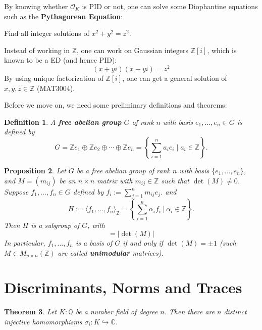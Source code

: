 \documentclass[11pt]{book}
\newtheorem{theorem}{Theorem}[section]
\newtheorem{definition}[theorem]{Definition}
\newtheorem{proposition}[theorem]{Proposition}
\begin{document}
By knowing whether $\mathcal{O}_K$ is PID or not, one can solve some Diophantine equations such as the {\bf Pythagorean Equation}: 
\begin{center}
Find all integer solutions of $x^2 + y^2 = z^2$.     
\end{center}
Instead of working in $\mathbb{Z}$, one can work on Gaussian integers $\mathbb{Z}[i]$, which is known to be a ED (and hence PID):
    \begin{equation*}
         (x + yi)(x - yi) = z^2
    \end{equation*}
By using unique factorization of $\mathbb{Z}[i]$, one can get a general solution of $x,y,z \in \mathbb{Z}$ (MAT3004). 

\medskip
Before we move on, we need some preliminary definitions and theorems:
\begin{definition}
A {\bf free abelian group} $G$ of rank $n$ with basis $e_1, \dots, e_n \in G$ is defined by
\begin{equation*}
    G = \mathbb{Z}e_1 \oplus \mathbb{Z}e_2 \oplus \cdots \oplus \mathbb{Z}e_n = \left\{ \sum_{i=1}^n a_i e_i \mid a_i \in \mathbb{Z} \right\}.
\end{equation*}
\end{definition}

\begin{proposition} \label{prop-indexfree}
Let $G$ be a free abelian group of rank $n$ with basis $\{e_1, \ldots, e_n\}$, and $M = (m_{ij})$ be an $n \times n$ matrix with $m_{ij} \in \mathbb{Z}$ such that $\det(M) \neq 0$.
Suppose $f_1, \dots, f_n \in G$ defined by $f_i := \sum_{j=1}^n m_{ij} e_j$.
and 
$$H := \langle f_1, \dots, f_n\rangle_{\mathbb{Z}} = \left\{\sum_{i=1}^n \alpha_if_i\ |\ \alpha_i \in \mathbb{Z}\right\}.$$
Then $H$ is a subgroup of $G$, with
\begin{equation*}
    [G : H] = |\det(M)|
\end{equation*}
In particular, $f_1, \dots, f_n$ is a basis of $G$ if and only if $\det(M) = \pm 1$ (such $M \in M_{n \times n}(\mathbb{Z})$ are called {\bf unimodular} matrices).
\end{proposition}


\section{Discriminants, Norms and Traces}

\begin{theorem} \label{thm-numfieldinj} Let $K:\mathbb{Q}$ be a number field of degree $n$. Then there are $n$ distinct injective homomorphisms $\sigma_i: K \hookrightarrow \mathbb{C}$.
\end{theorem}
\end{document}
